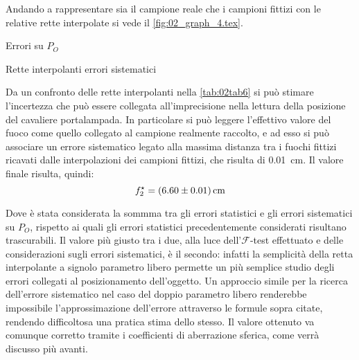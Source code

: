 Andando a rappresentare sia il campione reale che i campioni fittizi con le relative rette interpolate si vede il 
\autoref{fig:02_graph_4.tex}.
\begin{grafico} \centering  \caption{Errori su $P_O$} \label{fig:02_graph_4.tex} \end{grafico}
\begin{tabella}
	\centering
	
	\caption{Rette interpolanti errori sistematici}
	\label{tab:02tab6}
\end{tabella}
Da un confronto delle rette interpolanti nella \autoref{tab:02tab6} si può stimare l'incertezza che
 può essere collegata all'imprecisione nella lettura della
 posizione del cavaliere portalampada. In particolare si può leggere l'effettivo valore del fuoco come quello collegato al
 campione realmente raccolto, e ad esso si può associare un errore sistematico legato alla massima distanza tra i fuochi fittizi
 ricavati dalle interpolazioni dei campioni fittizi, che risulta di 0.01~cm. Il valore finale risulta, quindi:
\[f^{\star}_2 = (6.60 \pm 0.01) \,\mathrm{cm}\]

Dove è stata considerata la sommma tra gli errori statistici e gli errori sistematici su $P_O$, rispetto ai quali gli
 errori statistici precedentemente considerati risultano trascurabili.
 Il valore più giusto tra i due, alla luce dell'$\mathcal{F}$-test effettuato e delle considerazioni sugli errori sistematici, è il secondo:
 infatti la semplicità della retta interpolante a signolo parametro libero permette un più semplice studio degli errori collegati
 al posizionamento dell'oggetto. Un approccio simile per la ricerca dell'errore sistematico nel caso del doppio parametro libero
 renderebbe impossibile l'approssimazione dell'errore attraverso le formule sopra citate, rendendo difficoltosa una pratica stima
 dello stesso. Il valore ottenuto va comunque corretto tramite i coefficienti di aberrazione sferica, come verrà discusso più avanti.
